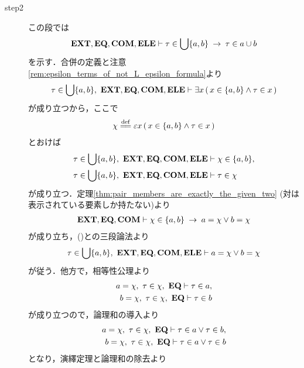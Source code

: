 \begin{sketch}
\begin{description}
			\item[step2] この段では
				\begin{align}
					\mbox{{\bf EXT}},\mbox{{\bf EQ}},\mbox{\bf COM},\mbox{{\bf ELE}} \vdash 
					\tau \in \bigcup \{a,b\} \hspace{0.25em}\rightarrow\hspace{0.25em} \tau \in a \cup b
				\end{align}
				を示す．合併の定義と注意\ref{rem:epsilon_terms_of_not_L_epsilon_formula}より
				\begin{align}
					\tau \in \bigcup \{a,b\},\ \EXTAX,\EQAX,\COMAX,\ELEAX \vdash 
					\exists x\, (\, x \in \{a,b\} \wedge \tau \in x\, )
				\end{align}
				が成り立つから，ここで
				\begin{align}
					\chi \defeq \varepsilon x\, (\, x \in \{a,b\} \wedge \tau \in x\, )
				\end{align}
				とおけば
				\begin{align}
					\tau \in \bigcup \{a,b\},\ \EXTAX,\EQAX,\COMAX,\ELEAX &\vdash \chi \in \{a,b\}, 
					\label{fom:union_of_two_sets_is_union_of_pair_1} \\
					\tau \in \bigcup \{a,b\},\ \EXTAX,\EQAX,\COMAX,\ELEAX &\vdash \tau \in \chi
					\label{fom:union_of_two_sets_is_union_of_pair_2}
				\end{align}
				が成り立つ．定理\ref{thm:pair_members_are_exactly_the_given_two}
				(対は表示されている要素しか持たない)より
				\begin{align}
					\mbox{{\bf EXT}},\mbox{{\bf EQ}},\mbox{\bf COM} \vdash \chi \in \{a,b\} \hspace{0.25em}\rightarrow\hspace{0.25em} a = \chi \vee b = \chi
				\end{align}
				が成り立ち，()との三段論法より
				\begin{align}
					\tau \in \bigcup \{a,b\},\ \EXTAX,\EQAX,\COMAX,\ELEAX \vdash a = \chi \vee b = \chi
					\label{fom:union_of_two_sets_is_union_of_pair_3}
				\end{align}
				が従う．他方で，相等性公理より
				\begin{align}
					a = \chi,\ \tau \in \chi,\ \mbox{{\bf EQ}} \vdash \tau \in a, \\
					b = \chi,\ \tau \in \chi,\ \mbox{{\bf EQ}} \vdash \tau \in b
				\end{align}
				が成り立つので，論理和の導入より
				\begin{align}
					a = \chi,\ \tau \in \chi,\ \mbox{{\bf EQ}} \vdash \tau \in a \vee \tau \in b, \\
					b = \chi,\ \tau \in \chi,\ \mbox{{\bf EQ}} \vdash \tau \in a \vee \tau \in b
				\end{align}
				となり，演繹定理と論理和の除去より
				\begin{align}

\end{align}
\end{description}
\end{sketch}
